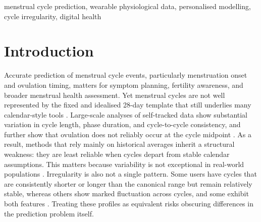 \documentclass[conference]{IEEEtran}
\begin{document}
\begin{abstract}
Accurate prediction of menstrual cycle events may support symptom planning, fertility awareness, and broader menstrual health assessment, but real-world cycles are not well captured by fixed-length or average-history assumptions. This problem is especially relevant under irregular cycling, where variability can reflect different patterns rather than a single condition. In this paper, we study menstrual event prediction in a daily setting using \textit{mcPHASES}, a multimodal dataset combining wearable, hormonal, and self-reported observations. We compare calendar and history-only baselines against a population wearable model and limited personalised settings under a strict subject-wise evaluation protocol, and we analyse performance across several irregularity profiles rather than a single regular-versus-irregular split. In this dataset, wearable benefit was more apparent in longer and more variable cycles, whereas shifted-but-stable profiles could still be served well by simple personal history. At the same time, the current form of personalisation did not improve robustly on the population wearable model. Overall, the results suggest that irregular cycling is better analysed through distinct irregularity profiles than through a single coarse grouping.
\end{abstract}

\begin{IEEEkeywords}
menstrual cycle prediction, wearable physiological data, personalised modelling, cycle irregularity, digital health
\end{IEEEkeywords}

\section{Introduction}
Accurate prediction of menstrual cycle events, particularly menstruation onset and ovulation timing, matters for symptom planning, fertility awareness, and broader menstrual health assessment. Yet menstrual cycles are not well represented by the fixed and idealised 28-day template that still underlies many calendar-style tools \cite{bull2019realworld,grieger2020global}. Large-scale analyses of self-tracked data show substantial variation in cycle length, phase duration, and cycle-to-cycle consistency, and further show that ovulation does not reliably occur at the cycle midpoint \cite{symul2019assessment,bull2019realworld,li2020characterizing}. As a result, methods that rely mainly on historical averages inherit a structural weakness: they are least reliable when cycles depart from stable calendar assumptions. This matters because variability is not exceptional in real-world populations \cite{li2020characterizing,bull2019realworld}. Irregularity is also not a single pattern. Some users have cycles that are consistently shorter or longer than the canonical range but remain relatively stable, whereas others show marked fluctuation across cycles, and some exhibit both features \cite{balen2024figo,pena2018majority,bull2019realworld,li2020characterizing}. Treating these profiles as equivalent risks obscuring differences in the prediction problem itself.
\end{document}
